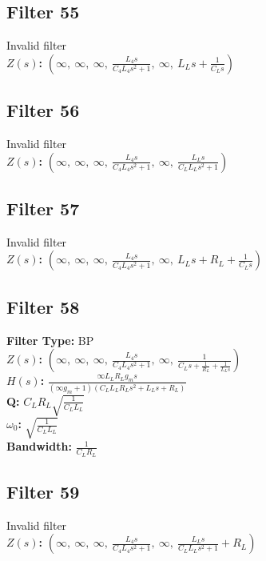 \documentclass{article}
\begin{document}
\subsection*{Filter 55}
Invalid filter \\ 
\textbf{$Z(s)$:} $\left( \infty, \  \infty, \  \infty, \  \frac{L_{4} s}{C_{4} L_{4} s^{2} + 1}, \  \infty, \  L_{L} s + \frac{1}{C_{L} s}\right)$ \\ 
\subsection*{Filter 56}
Invalid filter \\ 
\textbf{$Z(s)$:} $\left( \infty, \  \infty, \  \infty, \  \frac{L_{4} s}{C_{4} L_{4} s^{2} + 1}, \  \infty, \  \frac{L_{L} s}{C_{L} L_{L} s^{2} + 1}\right)$ \\ 
\subsection*{Filter 57}
Invalid filter \\ 
\textbf{$Z(s)$:} $\left( \infty, \  \infty, \  \infty, \  \frac{L_{4} s}{C_{4} L_{4} s^{2} + 1}, \  \infty, \  L_{L} s + R_{L} + \frac{1}{C_{L} s}\right)$ \\ 
\subsection*{Filter 58}
\textbf{Filter Type:} BP \\ 
\textbf{$Z(s)$:} $\left( \infty, \  \infty, \  \infty, \  \frac{L_{4} s}{C_{4} L_{4} s^{2} + 1}, \  \infty, \  \frac{1}{C_{L} s + \frac{1}{R_{L}} + \frac{1}{L_{L} s}}\right)$ \\ 
\textbf{$H(s)$:} $\frac{\infty L_{L} R_{L} g_{m} s}{\left(\infty g_{m} + 1\right) \left(C_{L} L_{L} R_{L} s^{2} + L_{L} s + R_{L}\right)}$ \\ 
\textbf{Q:} $C_{L} R_{L} \sqrt{\frac{1}{C_{L} L_{L}}}$ \\ 
\textbf{$\omega_0$:} $\sqrt{\frac{1}{C_{L} L_{L}}}$ \\ 
\textbf{Bandwidth:} $\frac{1}{C_{L} R_{L}}$ \\ 
\subsection*{Filter 59}
Invalid filter \\ 
\textbf{$Z(s)$:} $\left( \infty, \  \infty, \  \infty, \  \frac{L_{4} s}{C_{4} L_{4} s^{2} + 1}, \  \infty, \  \frac{L_{L} s}{C_{L} L_{L} s^{2} + 1} + R_{L}\right)$ \\ 
\end{document}
